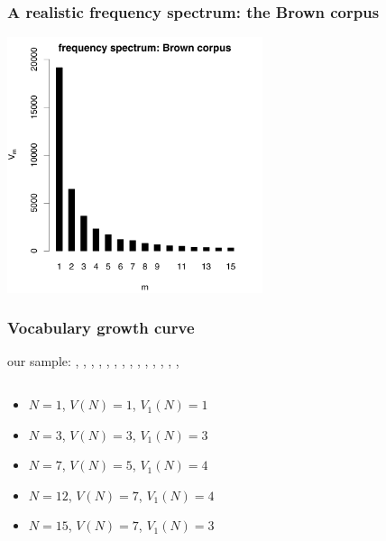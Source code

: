 \documentclass[t]{beamer} %
\begin{document}
\begin{frame}
  \frametitle{A realistic frequency spectrum: the Brown corpus}

  \ungap[1]
  \begin{center}
    \includegraphics[height=7.5cm]{../plots/tutorial_brown_spc}%
  \end{center}
\end{frame}

\begin{frame}
  \frametitle{Vocabulary growth curve}
  
    our sample: , \TA<2->{very}, , , , ,
  , , , , , ,
  , , 

  \begin{columns}[c]
    \begin{column}{6cm}
      \begin{itemize}
      \item<1-> $N = 1$, $V(N) = 1$, $V_1(N) = 1$
      \item<2-> $N = 3$, $V(N) = 3$, $V_1(N) = 3$
      \item<3-> $N = 7$, $V(N) = 5$, $V_1(N) = 4$
      \item<4-> $N = 12$, $V(N) = 7$, $V_1(N) = 4$
      \item<5-> $N = 15$, $V(N) = 7$, $V_1(N) = 3$
      \end{itemize}
    \end{column}
    \begin{column}{5cm}
    \end{column}
  \end{columns}

\end{frame}
\end{document}
